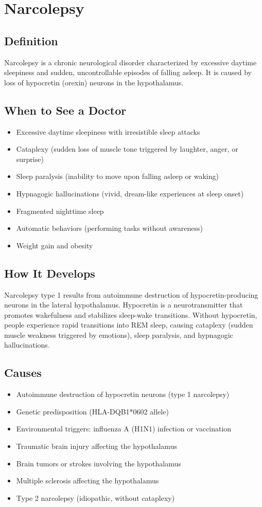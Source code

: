 \chapter{Narcolepsy}

\section*{Definition}
Narcolepsy is a chronic neurological disorder characterized by excessive daytime sleepiness and sudden, uncontrollable episodes of falling asleep. It is caused by loss of hypocretin (orexin) neurons in the hypothalamus.

\section*{When to See a Doctor}
\begin{itemize}
\item Excessive daytime sleepiness with irresistible sleep attacks
\item Cataplexy (sudden loss of muscle tone triggered by laughter, anger, or surprise)
\item Sleep paralysis (inability to move upon falling asleep or waking)
\item Hypnagogic hallucinations (vivid, dream-like experiences at sleep onset)
\item Fragmented nighttime sleep
\item Automatic behaviors (performing tasks without awareness)
\item Weight gain and obesity
\end{itemize}

\section*{How It Develops}
Narcolepsy type 1 results from autoimmune destruction of hypocretin-producing neurons in the lateral hypothalamus. Hypocretin is a neurotransmitter that promotes wakefulness and stabilizes sleep-wake transitions. Without hypocretin, people experience rapid transitions into REM sleep, causing cataplexy (sudden muscle weakness triggered by emotions), sleep paralysis, and hypnagogic hallucinations.

\section*{Causes}
\begin{itemize}
\item Autoimmune destruction of hypocretin neurons (type 1 narcolepsy)
\item Genetic predisposition (HLA-DQB1*0602 allele)
\item Environmental triggers: influenza A (H1N1) infection or vaccination
\item Traumatic brain injury affecting the hypothalamus
\item Brain tumors or strokes involving the hypothalamus
\item Multiple sclerosis affecting the hypothalamus
\item Type 2 narcolepsy (idiopathic, without cataplexy)
\end{itemize}

